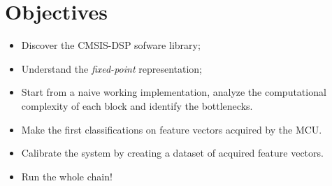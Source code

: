 \section*{Objectives}

\begin{itemize}
    \item Discover the CMSIS-DSP sofware library;
    \item Understand the \emph{fixed-point} representation;
    \item Start from a naive working implementation, analyze the computational complexity of each block and identify the bottlenecks.
    \item Make the first classifications on feature vectors acquired by the MCU.
    \item Calibrate the system by creating a dataset of acquired feature vectors.
    \item Run the whole chain!
\end{itemize}
